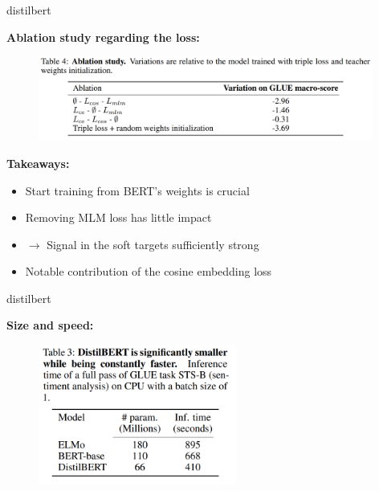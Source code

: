 \begin{frame}{distilbert}

\vfill

	\textbf{Ablation study regarding the loss:}

	\begin{figure}
		\centering
		\includegraphics[width = 11cm]{figure/53-distilbert-ablation.png}\\ 
	\end{figure}

\textbf{Takeaways:}

\begin{itemize}
	\item Start training from BERT's weights is crucial
	\item Removing MLM loss has little impact\\
	\item[] $\to$ Signal in the soft targets sufficiently strong
	\item Notable contribution of the cosine embedding loss
\end{itemize}

\vfill
	
\end{frame}


\begin{frame}{distilbert}

\vfill

\textbf{Size and speed:}

	\begin{figure}
		\centering
		\includegraphics[width = 6.5cm]{figure/53-distilbert-size-speed.png}\\ 
	\end{figure}

\vfill
	
\end{frame}

